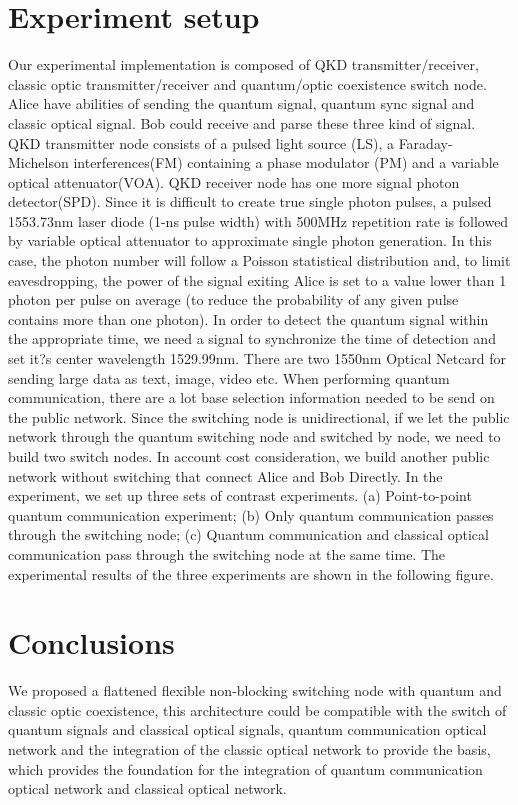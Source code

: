 \documentclass[letterpaper,10pt]{article}
\begin{document}
\section{Experiment setup}
Our experimental implementation is composed of QKD transmitter/receiver, classic optic transmitter/receiver and quantum/optic coexistence switch node. Alice have abilities of sending the quantum signal, quantum sync signal and classic optical signal. Bob could receive and parse these three kind of signal. QKD transmitter node consists of a pulsed light source (LS), a Faraday-Michelson interferences(FM) containing a phase modulator (PM) and a variable optical attenuator(VOA). QKD receiver node has one more signal photon detector(SPD). Since it is difficult to create true single photon pulses, a pulsed 1553.73nm laser diode (1-ns pulse width) with 500MHz repetition rate is followed by variable optical attenuator to approximate single photon generation. In this case, the photon number will follow a Poisson statistical distribution and, to limit eavesdropping, the power of the signal exiting Alice is set to a value lower than 1 photon per pulse on average (to reduce the probability of  any given pulse contains more than one photon). In order to detect the quantum signal within the appropriate time, we need a signal to synchronize the time of detection and set it?s center wavelength 1529.99nm. There are two 1550nm Optical Netcard for sending large data as text, image, video etc. When performing quantum communication, there are a lot base selection information needed to be send on the public network. Since the switching node is unidirectional, if we let the public network through the quantum switching node and switched by node, we need to build two switch nodes. In account cost consideration, we build another public network without switching  that connect Alice and Bob Directly. In the experiment, we set up three sets of contrast experiments. (a) Point-to-point quantum communication experiment; (b) Only quantum communication passes through the switching node; (c) Quantum communication and classical optical communication pass through the switching node at the same time. The experimental results of the three experiments are shown in the following figure.


\section{Conclusions}
We proposed a flattened flexible non-blocking switching node with quantum and classic optic coexistence, this architecture could be compatible with the switch of quantum signals and classical optical signals,  quantum communication optical network and the integration of the classic optical network to provide the basis, which provides the foundation for the integration of quantum communication optical network and classical optical network.
\end{document}
